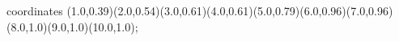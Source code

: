					coordinates { (1.0,0.39)(2.0,0.54)(3.0,0.61)(4.0,0.61)(5.0,0.79)(6.0,0.96)(7.0,0.96)(8.0,1.0)(9.0,1.0)(10.0,1.0)};